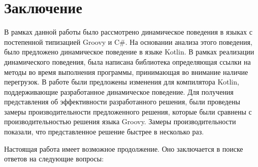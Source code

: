 \vfill
\clearpage
\section*{Заключение}



В рамках данной работы было рассмотрено динамическое поведения в языках с постепенной типизацией Groovy и C\#. На основании анализа этого поведения, было предложено динамическое поведение в языке Kotlin. В рамках реализации динамического поведения, была написана библиотека определяющая ссылки на методы во время выполнения программы, принимающая во внимание наличие перегрузок. В работе были предложены изменения для компилятора Kotlin, поддерживающие разработанное динамическое поведение. Для получения представления об эффективности разработанного решения, были проведены замеры производительности предложенного решения, которые были сравнены с производительностью решения языка Groovy.
Замеры производительности показали, что представленное решение быстрее в несколько раз.

Настоящая работа имеет возможное продолжение. Оно заключается в поиске ответов на следующие вопросы:

